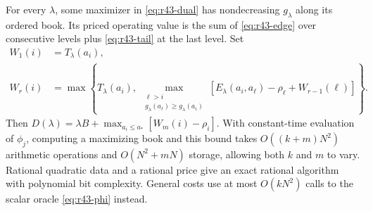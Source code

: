 \begin{theorem}\label{thm:r43-price}
For every $\lambda$, some maximizer in \eqref{eq:r43-dual} has nondecreasing $g_\lambda$ along its ordered book. Its priced operating value is the sum of \eqref{eq:r43-edge} over consecutive levels plus \eqref{eq:r43-tail} at the last level. Set
\begin{align}
 W_1(i)&=T_\lambda(a_i),\label{eq:r43-dp}\\
 W_r(i)&=\max\left\{T_\lambda(a_i),\ 
 \max_{\substack{\ell>i\\g_\lambda(a_\ell)\geq g_\lambda(a_i)}}
 [E_\lambda(a_i,a_\ell)-\rho_\ell+W_{r-1}(\ell)]\right\}.
 \nonumber
\end{align}
Then $D(\lambda)=\lambda B+\max_{a_i\leq a_*}[W_m(i)-\rho_i]$. With constant-time evaluation of $\phi_j$, computing a maximizing book and this bound takes $O((k+m)N^2)$ arithmetic operations and $O(N^2+mN)$ storage, allowing both $k$ and $m$ to vary. Rational quadratic data and a rational price give an exact rational algorithm with polynomial bit complexity. General costs use at most $O(kN^2)$ calls to the scalar oracle \eqref{eq:r43-phi} instead.
\end{theorem}
